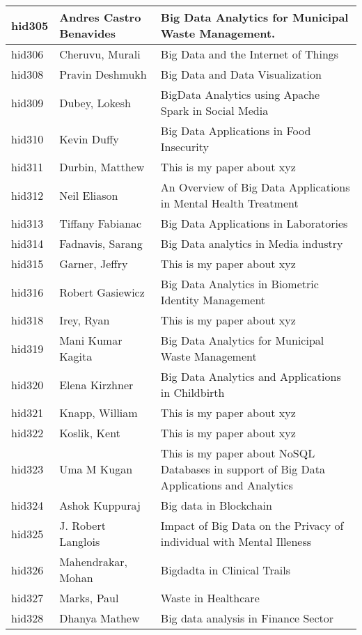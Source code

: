 \documentclass[12pt]{article}
\begin{document}
\begin{footnotesize}
\begin{longtable}{|p{1cm}p{5cm}p{9cm}|}
\hline
hid305 & Andres Castro Benavides & Big Data Analytics for Municipal Waste Management.  \\
\hline
hid306 & Cheruvu, Murali & Big Data and the Internet of Things  \\
\hline
hid308 & Pravin Deshmukh & Big Data and Data Visualization  \\
\hline
hid309 & Dubey, Lokesh & BigData Analytics using Apache Spark in Social Media  \\
\hline
hid310 & Kevin Duffy & Big Data Applications in Food Insecurity  \\
\hline
hid311 & Durbin, Matthew & This is my paper about xyz  \\
\hline
hid312 & Neil Eliason & An Overview of Big Data Applications in Mental Health Treatment  \\
\hline
hid313 & Tiffany Fabianac & Big Data Applications in Laboratories  \\
\hline
hid314 & Fadnavis, Sarang & Big Data analytics in Media industry  \\
\hline
hid315 & Garner, Jeffry & This is my paper about xyz  \\
\hline
hid316 & Robert Gasiewicz & Big Data Analytics in Biometric Identity Management  \\
\hline
hid318 & Irey, Ryan & This is my paper about xyz  \\
\hline
hid319 & Mani Kumar Kagita & Big Data Analytics for Municipal Waste Management  \\
\hline
hid320 & Elena Kirzhner & Big Data Analytics and Applications in Childbirth  \\
\hline
hid321 & Knapp, William & This is my paper about xyz  \\
\hline
hid322 & Koslik, Kent & This is my paper about xyz  \\
\hline
hid323 & Uma M Kugan & This is my paper about NoSQL Databases in support of Big Data Applications and Analytics  \\
\hline
hid324 & Ashok Kuppuraj & Big data in Blockchain  \\
\hline
hid325 & J. Robert Langlois & Impact of Big Data on the Privacy of individual with Mental Illeness  \\
\hline
hid326 & Mahendrakar, Mohan & Bigdadta in Clinical Trails  \\
\hline
hid327 & Marks, Paul & Waste in Healthcare  \\
\hline
hid328 & Dhanya Mathew & Big data analysis in Finance Sector  \\

\end{longtable}
\end{footnotesize}
\end{document}
